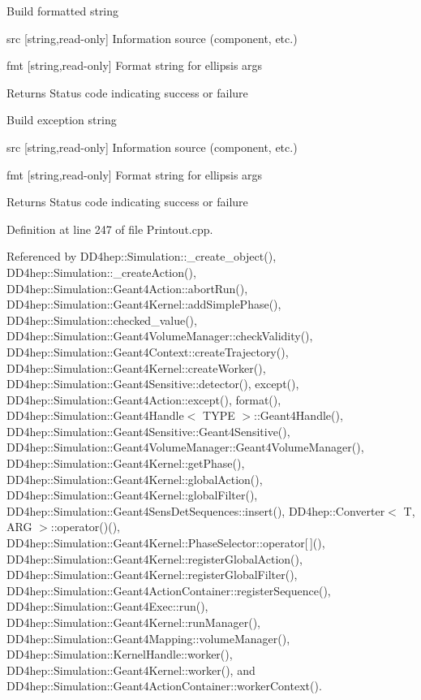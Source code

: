 Build formatted string \begin{DoxyItemize}
\item src \mbox{[}string,read-\/only\mbox{]} Information source (component, etc.) \item fmt \mbox{[}string,read-\/only\mbox{]} Format string for ellipsis args \begin{DoxyReturn}{Returns}
Status code indicating success or failure
\end{DoxyReturn}
Build exception string \item src \mbox{[}string,read-\/only\mbox{]} Information source (component, etc.) \item fmt \mbox{[}string,read-\/only\mbox{]} Format string for ellipsis args \begin{DoxyReturn}{Returns}
Status code indicating success or failure 
\end{DoxyReturn}
\end{DoxyItemize}


Definition at line 247 of file Printout.\+cpp.



Referenced by D\+D4hep\+::\+Simulation\+::\+\_\+create\+\_\+object(), D\+D4hep\+::\+Simulation\+::\+\_\+create\+Action(), D\+D4hep\+::\+Simulation\+::\+Geant4\+Action\+::abort\+Run(), D\+D4hep\+::\+Simulation\+::\+Geant4\+Kernel\+::add\+Simple\+Phase(), D\+D4hep\+::\+Simulation\+::checked\+\_\+value(), D\+D4hep\+::\+Simulation\+::\+Geant4\+Volume\+Manager\+::check\+Validity(), D\+D4hep\+::\+Simulation\+::\+Geant4\+Context\+::create\+Trajectory(), D\+D4hep\+::\+Simulation\+::\+Geant4\+Kernel\+::create\+Worker(), D\+D4hep\+::\+Simulation\+::\+Geant4\+Sensitive\+::detector(), except(), D\+D4hep\+::\+Simulation\+::\+Geant4\+Action\+::except(), format(), D\+D4hep\+::\+Simulation\+::\+Geant4\+Handle$<$ T\+Y\+P\+E $>$\+::\+Geant4\+Handle(), D\+D4hep\+::\+Simulation\+::\+Geant4\+Sensitive\+::\+Geant4\+Sensitive(), D\+D4hep\+::\+Simulation\+::\+Geant4\+Volume\+Manager\+::\+Geant4\+Volume\+Manager(), D\+D4hep\+::\+Simulation\+::\+Geant4\+Kernel\+::get\+Phase(), D\+D4hep\+::\+Simulation\+::\+Geant4\+Kernel\+::global\+Action(), D\+D4hep\+::\+Simulation\+::\+Geant4\+Kernel\+::global\+Filter(), D\+D4hep\+::\+Simulation\+::\+Geant4\+Sens\+Det\+Sequences\+::insert(), D\+D4hep\+::\+Converter$<$ T, A\+R\+G $>$\+::operator()(), D\+D4hep\+::\+Simulation\+::\+Geant4\+Kernel\+::\+Phase\+Selector\+::operator\mbox{[}$\,$\mbox{]}(), D\+D4hep\+::\+Simulation\+::\+Geant4\+Kernel\+::register\+Global\+Action(), D\+D4hep\+::\+Simulation\+::\+Geant4\+Kernel\+::register\+Global\+Filter(), D\+D4hep\+::\+Simulation\+::\+Geant4\+Action\+Container\+::register\+Sequence(), D\+D4hep\+::\+Simulation\+::\+Geant4\+Exec\+::run(), D\+D4hep\+::\+Simulation\+::\+Geant4\+Kernel\+::run\+Manager(), D\+D4hep\+::\+Simulation\+::\+Geant4\+Mapping\+::volume\+Manager(), D\+D4hep\+::\+Simulation\+::\+Kernel\+Handle\+::worker(), D\+D4hep\+::\+Simulation\+::\+Geant4\+Kernel\+::worker(), and D\+D4hep\+::\+Simulation\+::\+Geant4\+Action\+Container\+::worker\+Context().

